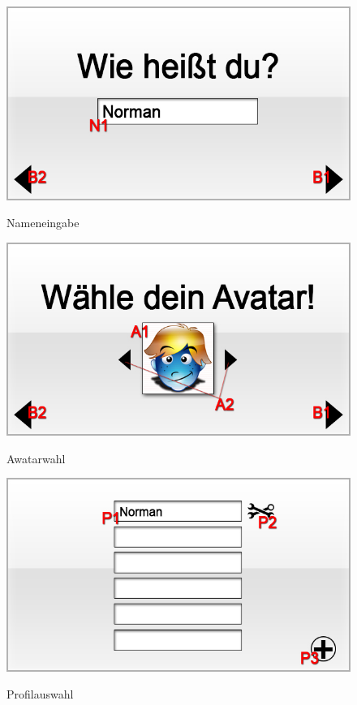 \begin{figure}[H]
\centering
{}\label{fig:Nameneingabe} 
\includegraphics[scale=0.55]
{../GUI-Entwurf/_jpeg_numeration/registration2.jpg}
\caption{Nameneingabe}
\end{figure}

\begin{figure}[H]
\centering
{}\label{fig:Awatarauswahl}
\includegraphics[scale=0.55]{../GUI-Entwurf/_jpeg_numeration/registration3.jpg}
\caption{Awatarwahl}
\end{figure}

\begin{figure}[H]
\centering
{}\label{fig:Profilauswahl}
\includegraphics[scale=0.55]{../GUI-Entwurf/_jpeg_numeration/choose_profile.jpg}
\caption{Profilauswahl}
\end{figure}

